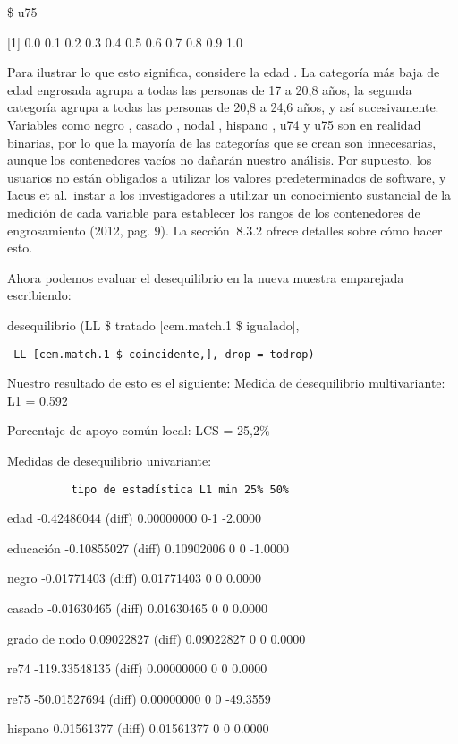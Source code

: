 \documentclass[
]{book}
\begin{document}
\$ u75

{[}1{]} 0.0 0.1 0.2 0.3 0.4 0.5 0.6 0.7 0.8 0.9 1.0

Para ilustrar lo que esto significa, considere la edad . La categoría más baja de edad engrosada agrupa a todas las personas de 17 a 20,8 años, la segunda categoría agrupa a todas las personas de 20,8 a 24,6 años, y así sucesivamente. Variables como negro , casado , nodal , hispano , u74 y u75 son en realidad binarias, por lo que la mayoría de las categorías que se crean son innecesarias, aunque los contenedores vacíos no dañarán nuestro análisis. Por supuesto, los usuarios no están obligados a utilizar los valores predeterminados de software, y Iacus et al.~instar a los investigadores a utilizar un conocimiento sustancial de la medición de cada variable para establecer los rangos de los contenedores de engrosamiento (2012, pag. 9). La sección  8.3.2 ofrece detalles sobre cómo hacer esto.

Ahora podemos evaluar el desequilibrio en la nueva muestra emparejada escribiendo:

desequilibrio (LL \$ tratado {[}cem.match.1 \$ igualado{]},

\begin{verbatim}
 LL [cem.match.1 $ coincidente,], drop = todrop)
\end{verbatim}

Nuestro resultado de esto es el siguiente: Medida de desequilibrio multivariante: L1 = 0.592

Porcentaje de apoyo común local: LCS = 25,2\%

Medidas de desequilibrio univariante:

\begin{verbatim}
          tipo de estadística L1 min 25% 50%
\end{verbatim}

edad -0.42486044 (diff) 0.00000000 0-1 -2.0000

educación -0.10855027 (diff) 0.10902006 0 0 -1.0000

negro -0.01771403 (diff) 0.01771403 0 0 0.0000

casado -0.01630465 (diff) 0.01630465 0 0 0.0000

grado de nodo 0.09022827 (diff) 0.09022827 0 0 0.0000

re74 -119.33548135 (diff) 0.00000000 0 0 0.0000

re75 -50.01527694 (diff) 0.00000000 0 0 -49.3559

hispano 0.01561377 (diff) 0.01561377 0 0 0.0000
\end{document}
